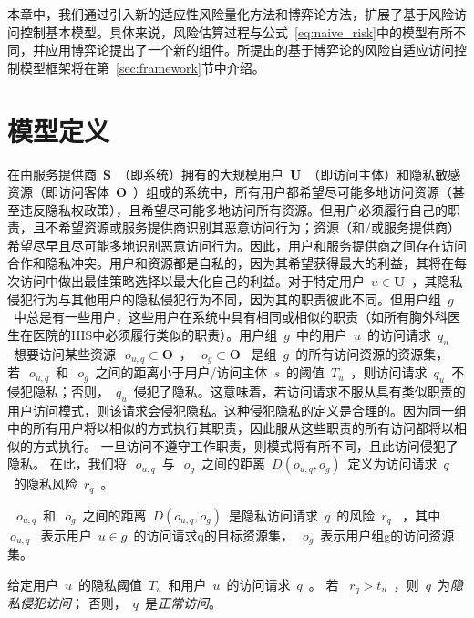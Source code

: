 本章中，我们通过引入新的适应性风险量化方法和博弈论方法，扩展了基于风险访问控制基本模型。具体来说，风险估算过程与公式~\ref{eq:naive_risk}中的模型有所不同，并应用博弈论提出了一个新的组件。所提出的基于博弈论的风险自适应访问控制模型框架将在第~\ref{sec:framework}节中介绍。


\section{模型定义}
\label{sec:notations}


在由服务提供商~$\mathbf{S}$~（即系统）拥有的大规模用户~$\mathbf{U}$~（即访问主体）和隐私敏感资源（即访问客体~$\mathbf{O}$~）组成的系统中，所有用户都希望尽可能多地访问资源（甚至违反隐私权政策），且希望尽可能多地访问所有资源。但用户必须履行自己的职责，且不希望资源或服务提供商识别其恶意访问行为；资源（和/或服务提供商）希望尽早且尽可能多地识别恶意访问行为。因此，用户和服务提供商之间存在访问合作和隐私冲突。用户和资源都是自私的，因为其希望获得最大的利益，其将在每次访问中做出最佳策略选择以最大化自己的利益。对于特定用户~$u \in \mathbf{U}$~，其隐私侵犯行为与其他用户的隐私侵犯行为不同，因为其的职责彼此不同。但用户组~$g$~中总是有一些用户，这些用户在系统中具有相同或相似的职责（如所有胸外科医生在医院的HIS中必须履行类似的职责）。用户组~$g$~中的用户~$u$~的访问请求~$q_u$~想要访问某些资源~$~o_{u,q} \subset \mathbf{O}$~，~$~o_{g} \subset \mathbf{O}$~ 是组~$g$~的所有访问资源的资源集，若~$~o_{u,q}$~和~$~o_{g}$~之间的距离小于用户/访问主体~$s$~的阈值~$T_u$~，则访问请求~$q_u$~不侵犯隐私；否则，~$q_u$~侵犯了隐私。这意味着，若访问请求不服从具有类似职责的用户访问模式，则该请求会侵犯隐私。这种侵犯隐私的定义是合理的。因为同一组中的所有用户将以相似的方式执行其职责，因此服从这些职责的所有访问都将以相似的方式执行。 一旦访问不遵守工作职责，则模式将有所不同，且此访问侵犯了隐私。 在此，我们将~$~o_{u,q}$~与~$~o_{g}$~之间的距离~$D(o_{u,q},o_{g})$~定义为访问请求~$q$~的隐私风险~$r_q$~。
\begin{definition}
	\label{def:privacy_risk}
	~$~o_{u,q}$~和~$~o_{g}$~之间的距离~$D(o_{u,q},o_{g})$~是隐私访问请求~$q$~的风险~$r_q$~ ，其中~$~o_{u,q}$~ 表示用户~$u \in g$~的访问请求q的目标资源集，~$~o_{g}$~表示用户组g的访问资源集。
\end{definition}

\begin{definition}
	\label{def:privacy_violation_access}
	
	给定用户~$u$~的隐私阈值~$T_u$~和用户~$u$~的访问请求~$q$~。 若 ~$r_q > t_u$~，则~$q$~为\textit{隐私侵犯访问}； 否则，~$q$~是\textit{正常访问}。
\end{definition}



